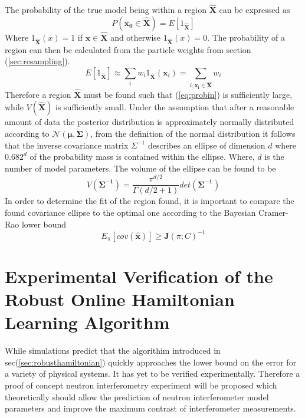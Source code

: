 The probability of the true model being within a region $\mathbf{\hat{X}}$ can be expressed as 
\begin{equation}
P(\mathbf{x_0}\in \mathbf{\hat{X}}) = E[1_{\mathbf{\hat{X}}}]
\end{equation}
Where $1_{\mathbf{\hat{X}}}(x) = 1$ if $\mathbf{x}\in \mathbf{\hat{X}}$ and otherwise $1_{\mathbf{\hat{X}}}(x) = 0$. 
The probability of a region can then be calculated from the particle weights from section (\ref{sec:resampling}). 
\begin{equation}
E[1_{\mathbf{\hat{X}}}] \approx \sum \limits_i w_i 1_{\mathbf{\hat{X}}}(\mathbf{x}_i) = \sum \limits_{i,\mathbf{x_i}\in\mathbf{\hat{X}}} w_i
\label{eq:probin}
\end{equation}
Therefore a region $\mathbf{\hat{X}}$ must be found such that (\ref{eq:probin}) is sufficiently large, while $V(\mathbf{\hat{X}})$ is sufficiently small. Under the assumption that after a reasonable amount of data the posterior distribution is approximately normally distributed according to $\mathcal{N}(\mathbf{\mu},\mathbf{\Sigma})$, from the definition of the normal distribution it follows that the inverse covariance matrix $\Sigma^{-1}$ describes an ellipse of dimension $d$ where $0.682^d$ of the probability mass is contained within the ellipse. Where, $d$ is the number of model parameters. 
The volume of the ellipse can be found to be 
\begin{equation}
V(\mathbf{\Sigma^{-1}}) = \frac{\pi^{d/2}}{\Gamma(d/2+1)}det(\mathbf{\Sigma^{-1}}) 
\end{equation}
In order to determine the fit of the region found, it is important to compare the found covariance ellipse to the optimal one according to the Bayesian Cramer-Rao lower bound 
\begin{equation*}
E_\pi [cov(\mathbf{\hat{x}})] \geq \mathbf{J}(\pi;C)^{-1}
\end{equation*}
\section{Experimental Verification of the Robust Online Hamiltonian Learning Algorithm}
While simulations predict that the algorithim introduced in sec(\ref{sec:robusthamiltonian}) quickly approaches the lower bound on the error for a variety of physical systems.\cite{hamiltonian_learning} It has yet to be verified experimentally. Therefore a proof of concept neutron interferometry experiment will be proposed which theoretically should allow the prediction of neutron interferometer model parameters and improve the maximum contrast of interferometer measurements.  
